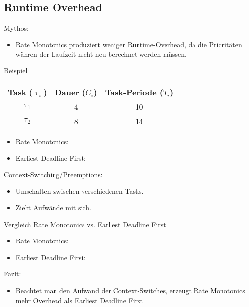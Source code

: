 \subsection{Runtime Overhead}\label{RuntimeOverhead}
\begin{frame}{Mythos:}
	\begin{itemize}
		\item Rate Monotonics produziert weniger Runtime-Overhead, da die Prioritäten währen der Laufzeit nicht neu berechnet werden müssen.
	\end{itemize}
\end{frame}

\begin{frame}{Beispiel}
	\begin{center}
		\begin{tabular}{c||c|c}
			Task ($\uptau_i$) & Dauer ($C_i$) & Task-Periode ($T_i$)\\\hline\hline
			$\uptau_1$ & 4 & 10\\
			$\uptau_2$ & 8 & 14
		\end{tabular}
	\end{center}
	\begin{itemize}
		\item Rate Monotonics:
	\end{itemize}
	
	\begin{itemize}
		\item Earliest Deadline First:	
	\end{itemize}

	
\end{frame}

\begin{frame}{Context-Switching/Preemptions:}
	\begin{itemize}
		\item Umschalten zwischen verschiedenen Tasks.
		\item Zieht Aufwände mit sich.
	\end{itemize}
\end{frame}

\newpage
\begin{frame}{Vergleich Rate Monotonics vs. Earliest Deadline First}
	\begin{itemize}
		\item Rate Monotonics:
	\end{itemize}
	
	\begin{itemize}
		\item Earliest Deadline First:	
	\end{itemize}
	
\end{frame}

\begin{frame}{Fazit:}
	\begin{itemize}
		\item Beachtet man den Aufwand der Context-Switches, erzeugt Rate Monotonics mehr Overhead als Earliest Deadline First
	\end{itemize}
\end{frame}
